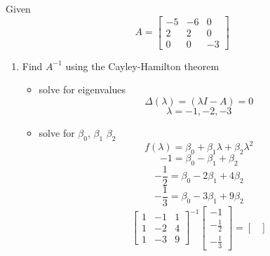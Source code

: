 \item Given
  \begin{equation}
    A = \begin{bmatrix}
-5 & -6 & 0\\
2 & 2 & 0\\
0 & 0 & -3
\end{bmatrix}
\end{equation}
  \begin{enumerate}
  \item Find $A^{-1}$ using the Cayley-Hamilton theorem \\
    \begin{itemize}
    \item solve for eigenvalues \\
      \begin{equation}
        \Delta(\lambda) = (\lambda I - A) = 0
      \end{equation}
      \begin{equation}
        \lambda = -1, -2, -3
      \end{equation}
    \item solve for $\beta_0$, $\beta_1$ $\beta_2$\\
      \begin{equation}
        f(\lambda) = \beta_0 + \beta_1\lambda + \beta_2\lambda^2
      \end{equation}
      \begin{equation}
        -1 = \beta_0 - \beta_1 + \beta_2
      \end{equation}
      \begin{equation}
        -\frac 1 2 = \beta_0 - 2\beta_1 + 4\beta_2
      \end{equation}
      \begin{equation}
        -\frac 1 3 = \beta_0 - 3\beta_1 + 9\beta_2
      \end{equation}
      \begin{equation}
        \begin{bmatrix}
          1 & -1 & 1 \\
          1 & -2 & 4 \\
          1 & -3 & 9
        \end{bmatrix}^{-1}
        \begin{bmatrix}
          -1 \\
          -\frac 1 2 \\
          -\frac 1 3
        \end{bmatrix} =
        \begin{bmatrix}

\end{bmatrix}
\end{equation}
\end{itemize}
\end{enumerate}
